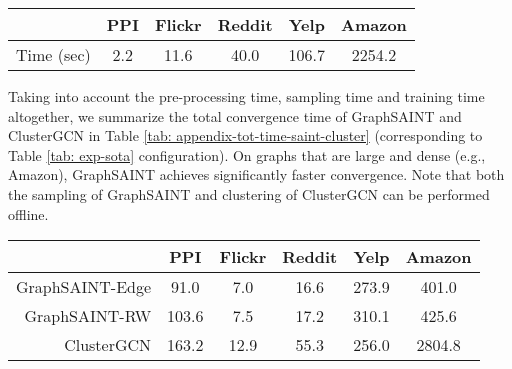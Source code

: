\documentclass{article} \usepackage{iclr2020_conference,times}
\newcommand{\graphsaint}{{\fontfamily{lmtt}\selectfont GraphSAINT}}
\begin{document}
\begin{table*}[!ht]
\caption{Clustering time of ClusterGCN}
    \centering
\begin{tabular}{rccccc}
        \toprule
        & PPI & Flickr & Reddit & Yelp & Amazon\\
        \midrule
        \midrule
        Time (sec) & 2.2 & 11.6 & 40.0 & 106.7 & 2254.2\\
        \bottomrule
    \end{tabular}\label{tab: cluster cost}
\end{table*}


Taking into account the pre-processing time, sampling time and training time altogether, we summarize the total convergence time of {\graphsaint} and ClusterGCN in Table \ref{tab: appendix-tot-time-saint-cluster} (corresponding to Table \ref{tab: exp-sota} configuration). 
On graphs that are large and dense (e.g., Amazon), {\graphsaint} achieves significantly faster convergence. 
Note that both the sampling of {\graphsaint} and clustering of ClusterGCN can be performed offline. 

\begin{table*}[!ht]
\caption{Comparison of total convergence time (pre-processing + sampling + training, unit: second)}
    \centering
\begin{tabular}{rccccc}
        \toprule
        & PPI & Flickr & Reddit & Yelp & Amazon\\
        \midrule
        \midrule
        {\graphsaint}-{\small Edge} & 91.0 & 7.0 & 16.6 & 273.9 & 401.0\\
        {\graphsaint}-{\small RW} & 103.6 & 7.5 & 17.2 & 310.1 & 425.6 \\
        ClusterGCN & 163.2 & 12.9 & 55.3 & 256.0 & 2804.8\\
        \bottomrule
    \end{tabular}\label{tab: appendix-tot-time-saint-cluster}
\end{table*}
\end{document}
